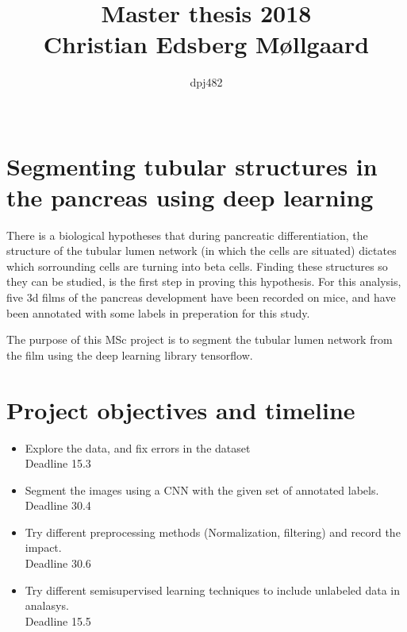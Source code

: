 \documentclass{article}
\author{
\Large{dpj482}\\
    \\ \texttt{}
}
\title{
  \vspace{3cm}
  \Huge{Master thesis 2018} \\
  \Large{Christian Edsberg Møllgaard}
}
\begin{document}


\clearpage\maketitle
\thispagestyle{empty}


\section*{Segmenting tubular structures in the pancreas using deep learning} %
\label{sec:title}
There is a biological hypotheses that during pancreatic differentiation, the
structure of the tubular lumen network (in which the cells are situated)
dictates which sorrounding cells are turning into beta cells.
Finding these structures so they can be studied, is the first step in proving
this hypothesis.
For this analysis, five 3d films of the pancreas development have been recorded on
mice, and have been annotated with some labels in preperation for this study.

The purpose of this MSc project is to segment the tubular lumen network from
the film using the deep learning library tensorflow.

\section*{Project objectives and timeline} %
\label{sec:project_goal}
\begin{itemize}
    \item Explore the data, and fix errors in the dataset\\
    Deadline 15.3
    \item Segment the images using a CNN with the given set of annotated labels.\\
    Deadline 30.4
    \item Try different preprocessing methods (Normalization, filtering) and record the impact.\\
    Deadline 30.6
    \item Try different semisupervised learning techniques to include unlabeled
    data in analasys.\\
    Deadline 15.5
\end{itemize}
\end{document}
